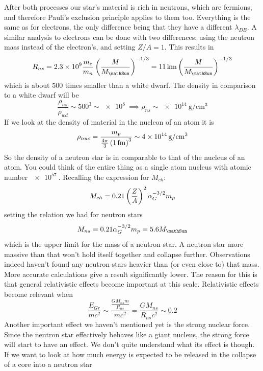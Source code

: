 After both processes our star's material is rich in neutrons, which are fermions, and therefore Pauli's exclusion principle applies to them too. Everything is the same as for electrons, the only difference being that they have a different \(\lambda_{DB}\). A similar analysis to electrons can be done with two differences: using the neutron mass instead of the electron's, and setting \(Z/A=1\). This results in
\begin{align}
    R_{ns} = \qty{2.3e9}{}\frac{m_e}{m_n}\ins{\frac{M}{M_\mathSun}}^{-1/3} = \qty{11}{\kilo\meter}\ins{\frac{M}{M_\mathSun}}^{-1/3}
\end{align}
which is about 500 times smaller than a white dwarf. The density in comparison to a white dwarf will be
\begin{equation}
    \frac{\rho_{ns}}{\rho_{wd}} \sim 500^3 \sim \qty{e8}{} \implies \rho_{ns} \sim \qty{e14}{\gram\per\centi\meter^3}
\end{equation}
If we look at the density of material in the nucleon of an atom it is
\begin{equation}
    \rho_{nuc} = \frac{m_p}{\frac{4\pi}{3}\ins{\qty{1}{\femto\meter}}^3}\sim \qty{4e14}{\gram\per\centi\meter^3}
\end{equation}
So the density of a neutron star is in comparable to that of the nucleus of an atom. You could think of the entire thing as a single atom nucleus with atomic number \(\qty{e57}{}\). Recalling the expression for \(M_{ch}\):
\begin{equation}
    M_{ch} = 0.21 \left(\frac{Z}{A}\right)^2\alpha_G^{-3/2}m_p
\end{equation}
setting the relation we had for neutron stars
\begin{equation}
    M_{ns}=0.21\alpha_G^{-3/2}m_p = 5.6M_\mathSun
\end{equation}
which is the upper limit for the mass of a neutron star. A neutron star more massive than that won't hold itself together and collapse further. Observations indeed haven't found any neutron stars heavier than (or even close to) that mass. More accurate calculations give a result significantly lower. The reason for this is that general relativistic effects become important at this scale. Relativistic effects become relevant when
\begin{equation}
    \frac{E_{Gr}}{mc^2}\sim\frac{\frac{GM_{ns}m}{R_{ns}}}{mc^2}=\frac{GM_{ns}}{R_{ns}c^2}\sim 0.2
\end{equation}
Another important effect we haven't mentioned yet is the strong nuclear force. Since the neutron star effectively behaves like a giant nucleus, the strong force will start to have an effect. We don't quite understand what its effect is though. If we want to look at how much energy is expected to be released in the collapse of a core into a neutron star
